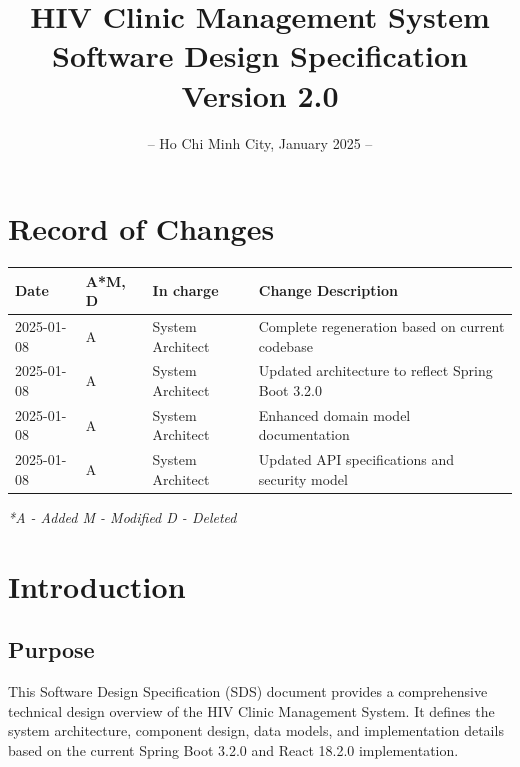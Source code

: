 \documentclass[12pt,a4paper]{article}
\title{
    \vspace{-2cm}
    \Huge\textbf{HIV Clinic Management System}\\
    \vspace{1cm}
    \Large\textbf{Software Design Specification}\\
    \vspace{2cm}
    \normalsize Version 2.0
}
\author{}
\date{
    \vspace{4cm}
    – Ho Chi Minh City, January 2025 –
}
\begin{document}
\maketitle
\thispagestyle{empty}

\newpage

\section*{Record of Changes}
\begin{longtable}{|p{3cm}|p{2cm}|p{3cm}|p{6cm}|}
\hline
\textbf{Date} & \textbf{A*M, D} & \textbf{In charge} & \textbf{Change Description} \\
\hline
2025-01-08 & A & System Architect & Complete regeneration based on current codebase \\
\hline
2025-01-08 & A & System Architect & Updated architecture to reflect Spring Boot 3.2.0 \\
\hline
2025-01-08 & A & System Architect & Enhanced domain model documentation \\
\hline
2025-01-08 & A & System Architect & Updated API specifications and security model \\
\hline
\end{longtable}

\textit{*A - Added M - Modified D - Deleted}

\newpage

\tableofcontents

\newpage

\section{Introduction}

\subsection{Purpose}
This Software Design Specification (SDS) document provides a comprehensive technical design overview of the HIV Clinic Management System. It defines the system architecture, component design, data models, and implementation details based on the current Spring Boot 3.2.0 and React 18.2.0 implementation.
\end{document}
